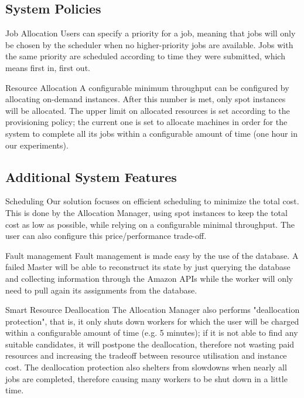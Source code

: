 \documentclass[a4paper]{IEEEtran}
\begin{document}
\subsection*{System Policies}

\begin{LaTeXdescription}

\item[Job Allocation]
Users can specify a priority for a job, meaning that jobs will only be chosen by the scheduler when no higher-priority jobs are available. Jobs with the same priority are scheduled according to time they were submitted, which means first in, first out.

\item[Resource Allocation]
A configurable minimum throughput can be configured by allocating on-demand instances. After this number is met, only spot instances will be allocated. The upper limit on allocated resources is set according to the provisioning policy; the current one is set to allocate machines in order for the system to complete all its jobs within a configurable amount of time (one hour in our experiments). 

\end{LaTeXdescription}

\subsection*{Additional System Features}

\begin{LaTeXdescription}
\item[Scheduling]
Our solution focuses on efficient scheduling to minimize the total cost. This is done by the Allocation Manager, using spot instances to keep the total cost as low as possible, while relying on a configurable minimal throughput.
The user can also configure this price/performance trade-off.

\item[Fault management]
Fault management is made easy by the use of the database. A failed Master will be able to reconstruct its state by just querying the database and collecting information through the Amazon APIs while the worker will only need to pull again its assignments from the database.

\item[Smart Resource Deallocation]
The Allocation Manager also performs "deallocation protection", that is, it only shuts down workers for which the user will be charged within a configurable amount of time (e.g. 5 minutes); if it is not able to find any suitable candidates, it will postpone the deallocation, therefore not wasting paid resources and increasing the tradeoff between resource utilisation and instance cost. The deallocation protection also shelters from slowdowns when nearly all jobs are completed, therefore causing many workers to be shut down in a little time.

\end{LaTeXdescription}
\end{document}
